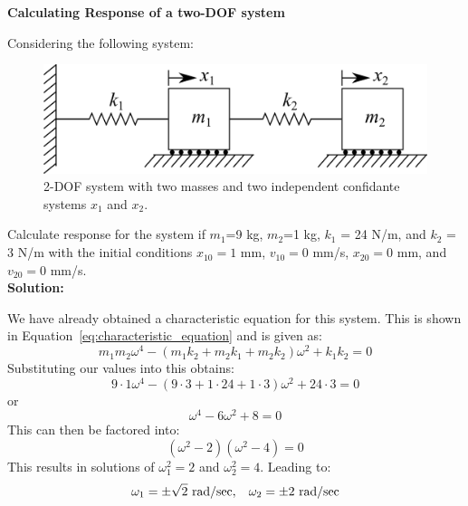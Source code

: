 \documentclass[12pt,letter]{article}
\begin{document}
	\begin{example}
	\label{ex:2-DOF}
	\textbf{Calculating Response of a two-DOF system}

	\noindent Considering the following system:
	\begin{figure}[H]
		\centering
		\includegraphics[]{../figures/2-DOF-spring_mass_horizontal.png}
		\caption{2-DOF system with two masses and two independent confidante systems $x_1$ and $x_2$.}
	\end{figure}
	Calculate response for the system if $m_1$=9 kg, $m_2$=1 kg, $k_1$ = 24 N/m, and $k_2$ = 3 N/m with the initial conditions $x_{10}=1$ mm, $v_{10}=0$ mm/s, $x_{20}=0$ mm, and $v_{20}=0$ mm/s. \\
	
	
	\noindent \textbf{Solution:} 

	\noindent  We have already obtained a characteristic equation for this system. This is shown in Equation~\ref{eq:characteristic_equation} and is given as:
	\begin{equation}
	m_1 m_2 \omega^4 - (m_1 k_2 + m_2 k_1 + m_2 k_2)\omega^2 + k_1 k_2 = 0
	\end{equation}
	Substituting our values into this obtains:
	\begin{equation}
	9 \cdot 1 \omega^4 - (9 \cdot 3 + 1 \cdot 24 + 1 \cdot 3)\omega^2 + 24 \cdot 3 = 0
	\end{equation}
	or
	\begin{equation}
	\omega^4 - 6\omega^2 + 8 =0
	\end{equation}
	This can then be factored into:
	\begin{equation}
	(\omega^2-2)(\omega^2-4)=0
	\end{equation}
	This results in solutions of $\omega^2_1 = 2$ and $\omega^2_2 = 4$. Leading to:
	\begin{equation}
	\omega_1 = \pm \sqrt{2} \text{ rad/sec}, \hspace{2ex} \omega_2 = \pm 2 \text{ rad/sec}
	\end{equation}
	

\end{example}
\end{document}
